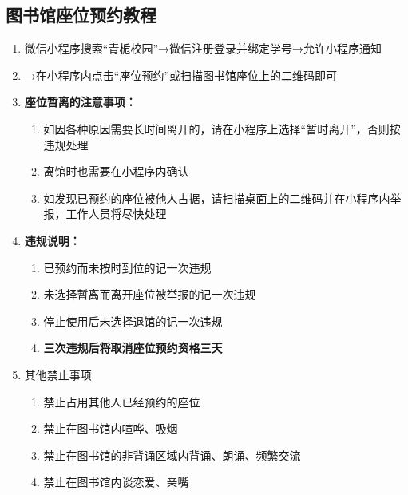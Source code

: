 \subsection[图书馆座位预约教程]{图书馆座位预约教程}
\label{library_book}
\begin{enumerate}
    \item 微信小程序搜索“青栀校园”→微信注册登录并绑定学号→允许小程序通知
    \item →在小程序内点击“座位预约”或扫描图书馆座位上的二维码即可
    \item \textbf{座位暂离的注意事项：}
          \begin{enumerate}
              \item 如因各种原因需要长时间离开的，请在小程序上选择“暂时离开”，否则按违规处理
              \item 离馆时也需要在小程序内确认
              \item 如发现已预约的座位被他人占据，请扫描桌面上的二维码并在小程序内举报，工作人员将尽快处理
          \end{enumerate}
    \item \textbf{违规说明：}
          \begin{enumerate}
              \item 已预约而未按时到位的记一次违规
              \item 未选择暂离而离开座位被举报的记一次违规
              \item 停止使用后未选择退馆的记一次违规
              \item \textbf{三次违规后将取消座位预约资格三天}
          \end{enumerate}
    \item 其他禁止事项
          \begin{enumerate}
              \item 禁止占用其他人已经预约的座位
              \item 禁止在图书馆内喧哗、吸烟
              \item 禁止在图书馆的非背诵区域内背诵、朗诵、频繁交流
              \item 禁止在图书馆内谈恋爱、亲嘴
          \end{enumerate}
\end{enumerate}

